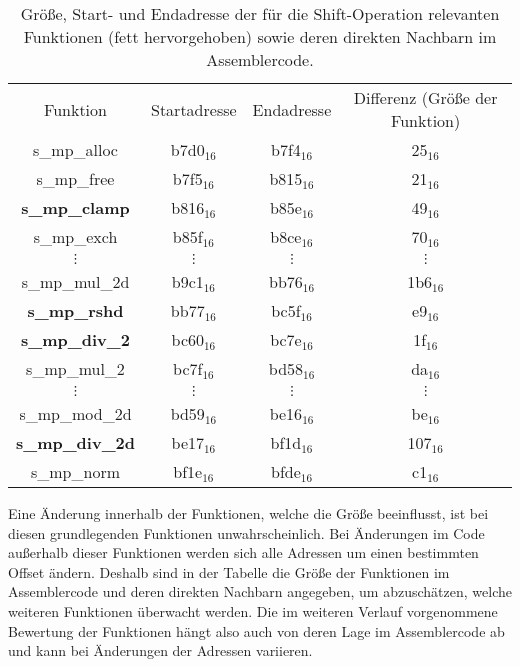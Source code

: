 \begin{table}[h]
\caption{Größe, Start- und Endadresse der für die Shift-Operation relevanten Funktionen (fett hervorgehoben) sowie deren direkten Nachbarn im Assemblercode.}
\label{tbl:assOffsetShift}
\begin{tabular}{cccc}
Funktion       & Startadresse & Endadresse & Differenz (Größe der Funktion) \\[10pt]
s\_mp\_alloc   & b7d0$_{16}$        & b7f4$_{16}$      & 25$_{16}$   \\
s\_mp\_free    & b7f5$_{16}$        & b815$_{16}$      & 21$_{16}$   \\
\textbf{s\_mp\_clamp}   & b816$_{16}$        & b85e$_{16}$      & 49$_{16}$   \\
s\_mp\_exch    & b85f$_{16}$        & b8ce$_{16}$      & 70$_{16}$   \\
$\vdots$               &  $\vdots$             &    $\vdots$         &     $\vdots$   \\
s\_mp\_mul\_2d & b9c1$_{16}$        & bb76$_{16}$      & 1b6$_{16}$   \\
\textbf{s\_mp\_rshd}    & bb77$_{16}$        & bc5f$_{16}$      & e9$_{16}$   \\
\textbf{s\_mp\_div\_2}  & bc60$_{16}$        & bc7e$_{16}$      & 1f$_{16}$   \\
s\_mp\_mul\_2  & bc7f$_{16}$        & bd58$_{16}$      & da$_{16}$   \\
$\vdots$               &  $\vdots$             &    $\vdots$         &     $\vdots$   \\
s\_mp\_mod\_2d & bd59$_{16}$        & be16$_{16}$      & be$_{16}$   \\
\textbf{s\_mp\_div\_2d} & be17$_{16}$        & bf1d$_{16}$      & 107$_{16}$  \\
s\_mp\_norm    & bf1e$_{16}$        & bfde$_{16}$      & c1$_{16}$  
\end{tabular}
\end{table}

Eine Änderung innerhalb der Funktionen, welche die Größe beeinflusst, ist bei diesen grundlegenden Funktionen unwahrscheinlich.
Bei Änderungen im Code außerhalb dieser Funktionen werden sich alle Adressen um einen bestimmten Offset ändern.
Deshalb sind in der Tabelle die Größe der Funktionen im Assemblercode und deren direkten Nachbarn angegeben, um abzuschätzen, welche weiteren Funktionen überwacht werden.
Die im weiteren Verlauf vorgenommene Bewertung der Funktionen hängt also auch von deren Lage im Assemblercode ab und kann bei Änderungen der Adressen variieren.

